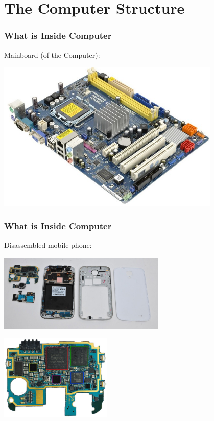 \documentclass{beamer}
\begin{document}
\section{The Computer Structure}
\begin{frame}
\frametitle{What is Inside Computer}

Mainboard (of the Computer):
\begin{center}
   \includegraphics[width=0.8\textwidth]{fig/motherboard.jpg}
\end{center}

\end{frame}

\begin{frame}
\frametitle{What is Inside Computer}

Disassembled mobile phone:
\begin{center}
   \includegraphics[width=0.6\textwidth]{fig/mobile.jpg}
\end{center}
\begin{center}
   \includegraphics[width=0.4\textwidth]{fig/mobile-cpu.jpg}
\end{center}
\end{frame}
\end{document}
